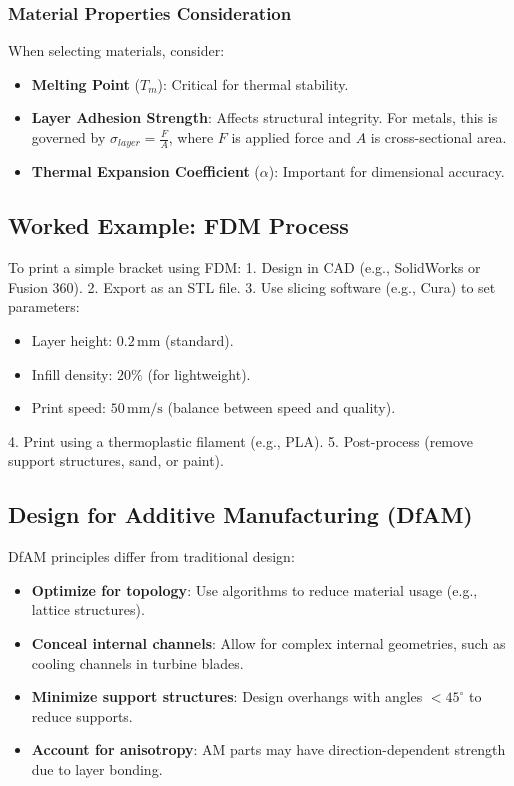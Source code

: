 \documentclass[12pt]{article}
\begin{document}
\subsubsection{Material Properties Consideration}
When selecting materials, consider:
\begin{itemize}
    \item \textbf{Melting Point} ($T_m$): Critical for thermal stability.
    \item \textbf{Layer Adhesion Strength}: Affects structural integrity. For metals, this is governed by $\sigma_{layer} = \frac{F}{A}$, where $F$ is applied force and $A$ is cross-sectional area.
    \item \textbf{Thermal Expansion Coefficient} ($\alpha$): Important for dimensional accuracy.
\end{itemize}

\subsection{Worked Example: FDM Process}
To print a simple bracket using FDM:
1. Design in CAD (e.g., SolidWorks or Fusion 360).
2. Export as an STL file.
3. Use slicing software (e.g., Cura) to set parameters:
   \begin{itemize}
       \item Layer height: $0.2\,\text{mm}$ (standard).
       \item Infill density: $20\%$ (for lightweight).
       \item Print speed: $50\,\text{mm/s}$ (balance between speed and quality).
   \end{itemize}
4. Print using a thermoplastic filament (e.g., PLA).
5. Post-process (remove support structures, sand, or paint).

\subsection{Design for Additive Manufacturing (DfAM)}
DfAM principles differ from traditional design:
\begin{itemize}
    \item \textbf{Optimize for topology}: Use algorithms to reduce material usage (e.g., lattice structures).
    \item \textbf{Conceal internal channels}: Allow for complex internal geometries, such as cooling channels in turbine blades.
    \item \textbf{Minimize support structures}: Design overhangs with angles $<45^\circ$ to reduce supports.
    \item \textbf{Account for anisotropy}: AM parts may have direction-dependent strength due to layer bonding.
\end{itemize}
\end{document}
